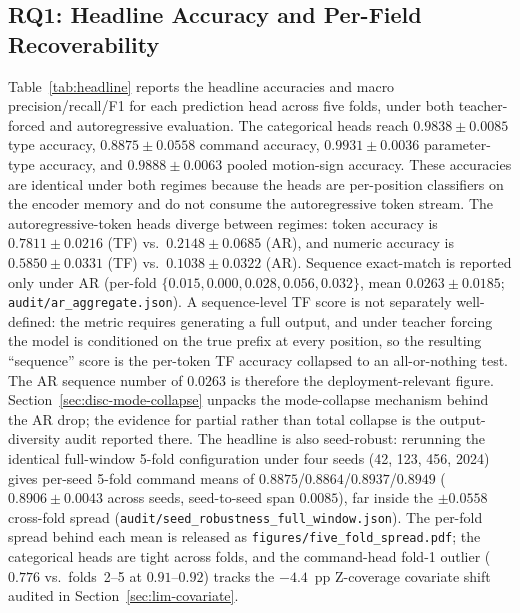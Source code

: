 \documentclass[sensors,article,submit,moreauthors,pdftex]{Definitions/mdpi}
\begin{document}
\subsection{RQ1: Headline Accuracy and Per-Field Recoverability}
\label{sec:results-headline}

Table~\ref{tab:headline} reports the headline accuracies and macro precision/recall/F1 for each prediction head across five folds, under both teacher-forced and autoregressive evaluation. The categorical heads reach $0.9838 \pm 0.0085$ type accuracy, $0.8875 \pm 0.0558$ command accuracy, $0.9931 \pm 0.0036$ parameter-type accuracy, and $0.9888 \pm 0.0063$ pooled motion-sign accuracy. These accuracies are identical under both regimes because the heads are per-position classifiers on the encoder memory and do not consume the autoregressive token stream. The autoregressive-token heads diverge between regimes: token accuracy is $0.7811 \pm 0.0216$ (TF) vs.\ $0.2148 \pm 0.0685$ (AR), and numeric accuracy is $0.5850 \pm 0.0331$ (TF) vs.\ $0.1038 \pm 0.0322$ (AR). Sequence exact-match is reported only under AR (per-fold $\{0.015, 0.000, 0.028, 0.056, 0.032\}$, mean $0.0263 \pm 0.0185$; \texttt{audit/ar\_aggregate.json}). A sequence-level TF score is not separately well-defined: the metric requires generating a full output, and under teacher forcing the model is conditioned on the true prefix at every position, so the resulting ``sequence'' score is the per-token TF accuracy collapsed to an all-or-nothing test. The AR sequence number of $0.0263$ is therefore the deployment-relevant figure. Section~\ref{sec:disc-mode-collapse} unpacks the mode-collapse mechanism behind the AR drop; the evidence for partial rather than total collapse is the output-diversity audit reported there. The headline is also seed-robust: rerunning the identical full-window 5-fold configuration under four seeds (42, 123, 456, 2024) gives per-seed 5-fold command means of $0.8875$/$0.8864$/$0.8937$/$0.8949$ ($0.8906 \pm 0.0043$ across seeds, seed-to-seed span $0.0085$), far inside the $\pm 0.0558$ cross-fold spread (\texttt{audit/seed\_robustness\_full\_window.json}). The per-fold spread behind each mean is released as \texttt{figures/five\_fold\_spread.pdf}; the categorical heads are tight across folds, and the command-head fold-1 outlier ($0.776$ vs.\ folds~2--5 at $0.91$--$0.92$) tracks the $-4.4$~pp Z-coverage covariate shift audited in Section~\ref{sec:lim-covariate}.
\end{document}
